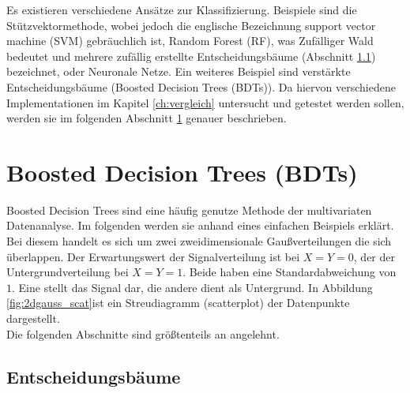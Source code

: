 Es existieren verschiedene Ans\"atze zur Klassifizierung. Beispiele sind die St\"utzvektormethode, wobei jedoch die englische Bezeichnung support vector machine (SVM) gebr\"auchlich ist, Random Forest (RF), was Zuf\"alliger Wald bedeutet und mehrere zuf\"allig erstellte Entscheidungsb\"aume (Abschnitt \ref{ch:Algorithmen:subsec:Entscheidungsbaum}) bezeichnet, oder Neuronale Netze. Ein weiteres Beispiel sind verst\"arkte Entscheidungsb\"aume (Boosted Decision Trees (BDTs)). Da hiervon verschiedene Implementationen im Kapitel \ref{ch:vergleich} untersucht und getestet werden sollen, werden sie im folgenden Abschnitt \ref{ch:Algorithmen:sec:BDT} genauer beschrieben.

\section{Boosted Decision Trees (BDTs)}
\label{ch:Algorithmen:sec:BDT}

Boosted Decision Trees sind eine h\"aufig genutze Methode der multivariaten Datenanalyse. Im folgenden werden sie anhand eines einfachen Beispiels erkl\"art. Bei diesem handelt es sich um zwei zweidimensionale Gau\ss verteilungen die sich \"uberlappen. Der Erwartungswert der Signalverteilung ist bei $X=Y=0$, der der Untergrundverteilung bei $X=Y=1$. Beide haben eine Standardabweichung von $1$. Eine stellt das Signal dar, die andere dient als Untergrund. In Abbildung \ref{fig:2dgauss_scat}ist ein Streudiagramm (scatterplot) der Datenpunkte dargestellt.\\
Die folgenden Abschnitte sind gr\"o\ss tenteils an \cite{SWB-307748006} angelehnt.

\subsection{Entscheidungsb\"aume}
\label{ch:Algorithmen:subsec:Entscheidungsbaum}

